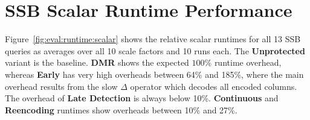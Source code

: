 \section{SSB Scalar Runtime Performance}
\label{sec:SSBEval:scalar}

Figure~\ref{fig:eval:runtime:scalar} shows the relative scalar runtimes for all 13 SSB queries as averages over all 10 scale factors and 10 runs each. The \textbf{Unprotected} variant is the baseline. \textbf{DMR} shows the expected \(100\%\) runtime overhead, whereas \textbf{Early} has very high overheads between 64\% and 185\%, where the main overhead results from the slow \(\Delta\) operator which decodes all encoded columns. The overhead of \textbf{Late Detection} is always below 10\%. \textbf{Continuous} and \textbf{Reencoding} runtimes show overheads between 10\% and 27\%.
